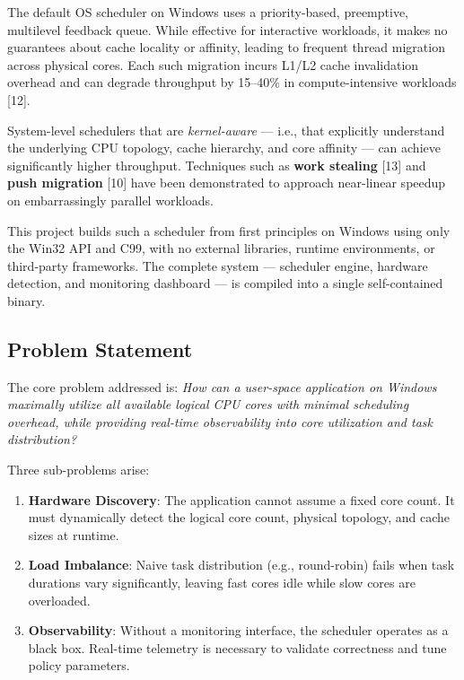 \documentclass[12pt,a4paper]{article}
\begin{document}
The default OS scheduler on Windows uses a priority-based, preemptive, multilevel feedback queue. While effective for interactive workloads, it makes no guarantees about cache locality or affinity, leading to frequent thread migration across physical cores. Each such migration incurs L1/L2 cache invalidation overhead and can degrade throughput by 15--40\% in compute-intensive workloads [12].

System-level schedulers that are \textit{kernel-aware} --- i.e., that explicitly understand the underlying CPU topology, cache hierarchy, and core affinity --- can achieve significantly higher throughput. Techniques such as \textbf{work stealing} [13] and \textbf{push migration} [10] have been demonstrated to approach near-linear speedup on embarrassingly parallel workloads.

This project builds such a scheduler from first principles on Windows using only the Win32 API and C99, with no external libraries, runtime environments, or third-party frameworks. The complete system --- scheduler engine, hardware detection, and monitoring dashboard --- is compiled into a single self-contained binary.

\subsection{Problem Statement}

The core problem addressed is: \textit{How can a user-space application on Windows maximally utilize all available logical CPU cores with minimal scheduling overhead, while providing real-time observability into core utilization and task distribution?}

Three sub-problems arise:
\begin{enumerate}[label=\roman*.]
  \item \textbf{Hardware Discovery}: The application cannot assume a fixed core count. It must dynamically detect the logical core count, physical topology, and cache sizes at runtime.
  \item \textbf{Load Imbalance}: Naive task distribution (e.g., round-robin) fails when task durations vary significantly, leaving fast cores idle while slow cores are overloaded.
  \item \textbf{Observability}: Without a monitoring interface, the scheduler operates as a black box. Real-time telemetry is necessary to validate correctness and tune policy parameters.
\end{enumerate}
\end{document}
